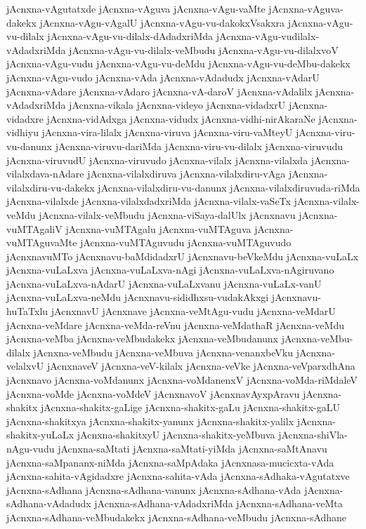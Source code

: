 {jAcnxna-vAgutatxde
jAcnxna-vAguva
jAcnxna-vAgu-vaMte
jAcnxna-vAguva-dakekx
jAcnxna-vAgu-vAgalU
jAcnxna-vAgu-vu-dakokxVsakxra
jAcnxna-vAgu-vu-dilalx
jAcnxna-vAgu-vu-dilalx-dAdadxriMda
jAcnxna-vAgu-vudilalx-vAdadxriMda
jAcnxna-vAgu-vu-dilalx-veMbudu
jAcnxna-vAgu-vu-dilalxvoV
jAcnxna-vAgu-vudu
jAcnxna-vAgu-vu-deMdu
jAcnxna-vAgu-vu-deMbu-dakekx
jAcnxna-vAgu-vudo
jAcnxna-vAda
jAcnxna-vAdadudx
jAcnxna-vAdarU
jAcnxna-vAdare
jAcnxna-vAdaro
jAcnxna-vA-daroV
jAcnxna-vAdalilx
jAcnxna-vAdadxriMda
jAcnxna-vikala
jAcnxna-videyo
jAcnxna-vidadxrU
jAcnxna-vidadxre
jAcnxna-vidAdxga
jAcnxna-vidudx
jAcnxna-vidhi-nirAkaraNe
jAcnxna-vidhiyu
jAcnxna-vira-lilalx
jAcnxna-viruva
jAcnxna-viru-vaMteyU
jAcnxna-viru-vu-danunx
jAcnxna-viruvu-dariMda
jAcnxna-viru-vu-dilalx
jAcnxna-viruvudu
jAcnxna-viruvudU
jAcnxna-viruvudo
jAcnxna-vilalx
jAcnxna-vilalxda
jAcnxna-vilalxdava-nAdare
jAcnxna-vilalxdiruva
jAcnxna-vilalxdiru-vAga
jAcnxna-vilalxdiru-vu-dakekx
jAcnxna-vilalxdiru-vu-danunx
jAcnxna-vilalxdiruvuda-riMda
jAcnxna-vilalxde
jAcnxna-vilalxdadxriMda
jAcnxna-vilalx-vaSeTx
jAcnxna-vilalx-veMdu
jAcnxna-vilalx-veMbudu
jAcnxna-viSaya-dalUlx
jAcnxnavu
jAcnxna-vuMTAgaliV
jAcnxna-vuMTAgalu
jAcnxna-vuMTAguva
jAcnxna-vuMTAguvaMte
jAcnxna-vuMTAguvudu
jAcnxna-vuMTAguvudo
jAcnxnavuMTo
jAcnxnavu-baMdidadxrU
jAcnxnavu-beVkeMdu
jAcnxna-vuLaLx
jAcnxna-vuLaLxva
jAcnxna-vuLaLxva-nAgi
jAcnxna-vuLaLxva-nAgiruvano
jAcnxna-vuLaLxva-nAdarU
jAcnxna-vuLaLxvanu
jAcnxna-vuLaLx-vanU
jAcnxna-vuLaLxva-neMdu
jAcnxnavu-sididhxsu-vudakAkxgi
jAcnxnavu-huTaTxlu
jAcnxnavU
jAcnxnave
jAcnxna-veMtAgu-vudu
jAcnxna-veMdarU
jAcnxna-veMdare
jAcnxna-veMda-reVnu
jAcnxna-veMdathaR
jAcnxna-veMdu
jAcnxna-veMba
jAcnxna-veMbudakekx
jAcnxna-veMbudanunx
jAcnxna-veMbu-dilalx
jAcnxna-veMbudu
jAcnxna-veMbuva
jAcnxna-venanxbeVku
jAcnxna-velalxvU
jAcnxnaveV
jAcnxna-veV-kilalx
jAcnxna-veVke
jAcnxna-veVparxdhAna
jAcnxnavo
jAcnxna-voMdanunx
jAcnxna-voMdanenxV
jAcnxna-voMda-riMdaleV
jAcnxna-voMde
jAcnxna-voMdeV
jAcnxnavoV
jAcnxnavAyxpAravu
jAcnxna-shakitx
jAcnxna-shakitx-gaLige
jAcnxna-shakitx-gaLu
jAcnxna-shakitx-gaLU
jAcnxna-shakitxya
jAcnxna-shakitx-yanunx
jAcnxna-shakitx-yalilx
jAcnxna-shakitx-yuLaLx
jAcnxna-shakitxyU
jAcnxna-shakitx-yeMbuva
jAcnxna-shiVla-nAgu-vudu
jAcnxna-saMtati
jAcnxna-saMtati-yiMda
jAcnxna-saMtAnavu
jAcnxna-saMpananx-niMda
jAcnxna-saMpAdaka
jAcnxnasa-mucicxta-vAda
jAcnxna-sahita-vAgidadxre
jAcnxna-sahita-vAda
jAcnxna-sAdhaka-vAgutatxve
jAcnxna-sAdhana
jAcnxna-sAdhana-vanunx
jAcnxna-sAdhana-vAda
jAcnxna-sAdhana-vAdadudx
jAcnxna-sAdhana-vAdadxriMda
jAcnxna-sAdhana-veMta
jAcnxna-sAdhana-veMbudakekx
jAcnxna-sAdhana-veMbudu
jAcnxna-sAdhane
}
